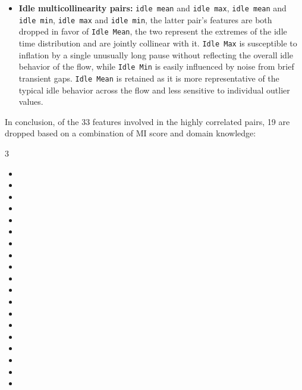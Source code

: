\begin{itemize}
    \item \textbf{Idle multicollinearity pairs:}  \texttt{idle mean} and \texttt{idle max}, \texttt{idle mean} and \texttt{idle min}, \texttt{idle max} and \texttt{idle min}, the latter pair's features are both dropped in favor of \texttt{Idle Mean}, the two represent the extremes of the idle time distribution and are jointly collinear with it. \texttt{Idle Max} is susceptible to inflation by a single unusually long pause without reflecting the overall idle behavior of the flow, while \texttt{Idle Min} is easily influenced by noise from brief transient gaps. \texttt{Idle Mean} is retained as it is more representative of the typical idle behavior across the flow and less sensitive to individual outlier values.
\end{itemize}

In conclusion, of the 33 features involved in the highly correlated pairs, 19 are dropped based on a combination of MI score and domain knowledge:

\begin{multicols}{3}
    \begin{itemize}
        \item {}
        \item {}
        \item {}
        \item {}
        \item {}
        \item {}
        \item {}
        \item {}
        \item {}
        \item {}
        \item {}
        \item {}
        \item {}
        \item {}
        \item {}
        \item {}
        \item {}
        \item {}
        \item {}
    \end{itemize}
\end{multicols}

